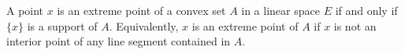 A point $x$ is an extreme point of a convex set $A$ in a linear space $E$ if and only if $\{x\}$ is a support of $A$. Equivalently, $x$ is an extreme point of $A$ if $x$ is not an interior point of any line segment contained in $A$.
